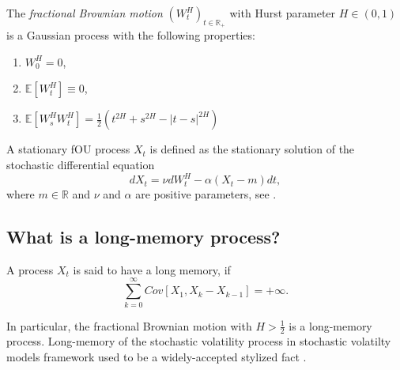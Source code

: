     \begin{definition}
        The \emph{fractional Brownian motion} $(W_t^H)_{t\in \mathbb{R_+}}$ with Hurst 
        parameter $H \in (0, 1)$ is a Gaussian process with the following properties:
        \begin{enumerate}
            \item $W_0^H = 0$,
            \item $\mathbb{E}\left[W_t^H\right] \equiv 0$,
            \item $\mathbb{E}\left[W_s^H W_t^H\right] = \frac{1}{2} \left(t^{2H} + s^{2H} - |t-s|^{2H}\right)$
        \end{enumerate}
    \end{definition}

    \begin{definition}
        A stationary fOU process $X_t$ is defined as the stationary solution of the stochastic differential equation
        \begin{equation}
            dX_t = \nu dW^H_t - \alpha (X_t - m)dt,
        \end{equation}
        where $m \in \mathbb{R}$ and $\nu$ and $\alpha$ are positive parameters, see \cite{Cheridito2003}.
    \end{definition}

    \subsection{What is a long-memory process?}
        \begin{definition}
            A process $X_t$ is said to have a long memory, if 
            \begin{equation}
                \sum_{k=0}^{\infty}Cov\left[X_1 , X_{k} - X_{k-1}\right] = +\infty.
            \end{equation}
        \end{definition}

        In particular, the fractional Brownian motion with $H > \frac{1}{2}$ is a long-memory process.
        Long-memory of the stochastic volatility process in stochastic volatilty models framework used to be a 
        widely-accepted stylized fact \cite{Breidt1998,ComteRenault1998,Comte1996,Ding1993}.

